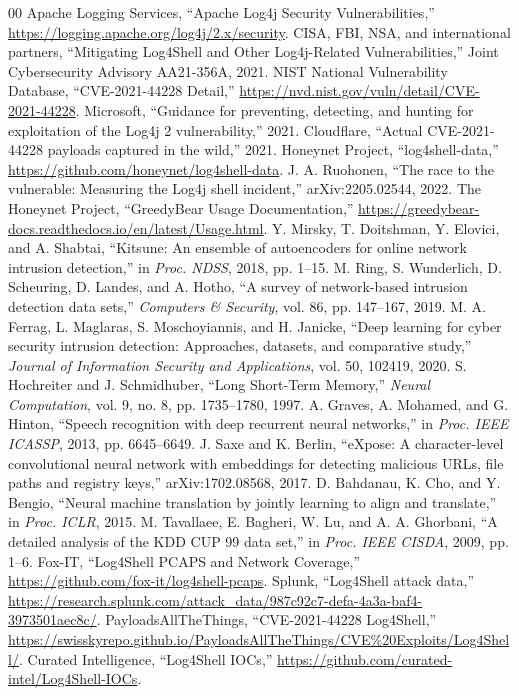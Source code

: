 \documentclass[conference]{IEEEtran}
\begin{document}
\begin{thebibliography}{00}
 Apache Logging Services, ``Apache Log4j Security Vulnerabilities,'' \url{https://logging.apache.org/log4j/2.x/security}.
 CISA, FBI, NSA, and international partners, ``Mitigating Log4Shell and Other Log4j-Related Vulnerabilities,'' Joint Cybersecurity Advisory AA21-356A, 2021.
 NIST National Vulnerability Database, ``CVE-2021-44228 Detail,'' \url{https://nvd.nist.gov/vuln/detail/CVE-2021-44228}.
 Microsoft, ``Guidance for preventing, detecting, and hunting for exploitation of the Log4j 2 vulnerability,'' 2021.
 Cloudflare, ``Actual CVE-2021-44228 payloads captured in the wild,'' 2021.
 Honeynet Project, ``log4shell-data,'' \url{https://github.com/honeynet/log4shell-data}.
 J. A. Ruohonen, ``The race to the vulnerable: Measuring the Log4j shell incident,'' arXiv:2205.02544, 2022.
 The Honeynet Project, ``GreedyBear Usage Documentation,'' \url{https://greedybear-docs.readthedocs.io/en/latest/Usage.html}.
 Y. Mirsky, T. Doitshman, Y. Elovici, and A. Shabtai, ``Kitsune: An ensemble of autoencoders for online network intrusion detection,'' in \textit{Proc. NDSS}, 2018, pp. 1--15.
 M. Ring, S. Wunderlich, D. Scheuring, D. Landes, and A. Hotho, ``A survey of network-based intrusion detection data sets,'' \textit{Computers \& Security}, vol. 86, pp. 147--167, 2019.
 M. A. Ferrag, L. Maglaras, S. Moschoyiannis, and H. Janicke, ``Deep learning for cyber security intrusion detection: Approaches, datasets, and comparative study,'' \textit{Journal of Information Security and Applications}, vol. 50, 102419, 2020.
 S. Hochreiter and J. Schmidhuber, ``Long Short-Term Memory,'' \textit{Neural Computation}, vol. 9, no. 8, pp. 1735--1780, 1997.
 A. Graves, A. Mohamed, and G. Hinton, ``Speech recognition with deep recurrent neural networks,'' in \textit{Proc. IEEE ICASSP}, 2013, pp. 6645--6649.
 J. Saxe and K. Berlin, ``eXpose: A character-level convolutional neural network with embeddings for detecting malicious URLs, file paths and registry keys,'' arXiv:1702.08568, 2017.
 D. Bahdanau, K. Cho, and Y. Bengio, ``Neural machine translation by jointly learning to align and translate,'' in \textit{Proc. ICLR}, 2015.
 M. Tavallaee, E. Bagheri, W. Lu, and A. A. Ghorbani, ``A detailed analysis of the KDD CUP 99 data set,'' in \textit{Proc. IEEE CISDA}, 2009, pp. 1--6.
 Fox-IT, ``Log4Shell PCAPS and Network Coverage,'' \url{https://github.com/fox-it/log4shell-pcaps}.
 Splunk, ``Log4Shell attack data,'' \url{https://research.splunk.com/attack_data/987c92c7-defa-4a3a-baf4-3973501aec8c/}.
 PayloadsAllTheThings, ``CVE-2021-44228 Log4Shell,'' \url{https://swisskyrepo.github.io/PayloadsAllTheThings/CVE%20Exploits/Log4Shell/}.
 Curated Intelligence, ``Log4Shell IOCs,'' \url{https://github.com/curated-intel/Log4Shell-IOCs}.
\end{thebibliography}
\end{document}
